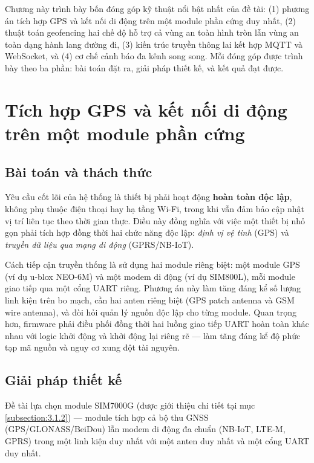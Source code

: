 \documentclass[../DoAn.tex]{subfiles}
\begin{document}
Chương này trình bày bốn đóng góp kỹ thuật nổi bật nhất của đề tài: (1) phương án tích hợp GPS và kết nối di động trên một module phần cứng duy nhất, (2) thuật toán geofencing hai chế độ hỗ trợ cả vùng an toàn hình tròn lẫn vùng an toàn dạng hành lang đường đi, (3) kiến trúc truyền thông lai kết hợp MQTT và WebSocket, và (4) cơ chế cảnh báo đa kênh song song. Mỗi đóng góp được trình bày theo ba phần: bài toán đặt ra, giải pháp thiết kế, và kết quả đạt được.

\section{Tích hợp GPS và kết nối di động trên một module phần cứng}
\label{section:5.1}

\subsection{Bài toán và thách thức}

Yêu cầu cốt lõi của hệ thống là thiết bị phải hoạt động \textbf{hoàn toàn độc lập}, không phụ thuộc điện thoại hay hạ tầng Wi-Fi, trong khi vẫn đảm bảo cập nhật vị trí liên tục theo thời gian thực. Điều này đồng nghĩa với việc một thiết bị nhỏ gọn phải tích hợp đồng thời hai chức năng độc lập: \textit{định vị vệ tinh} (GPS) và \textit{truyền dữ liệu qua mạng di động} (GPRS/NB-IoT).

Cách tiếp cận truyền thống là sử dụng hai module riêng biệt: một module GPS (ví dụ u-blox NEO-6M) và một modem di động (ví dụ SIM800L), mỗi module giao tiếp qua một cổng UART riêng. Phương án này làm tăng đáng kể số lượng linh kiện trên bo mạch, cần hai anten riêng biệt (GPS patch antenna và GSM wire antenna), và đòi hỏi quản lý nguồn độc lập cho từng module. Quan trọng hơn, firmware phải điều phối đồng thời hai luồng giao tiếp UART hoàn toàn khác nhau với logic khởi động và khởi động lại riêng rẽ — làm tăng đáng kể độ phức tạp mã nguồn và nguy cơ xung đột tài nguyên.

\subsection{Giải pháp thiết kế}

Đề tài lựa chọn module SIM7000G (được giới thiệu chi tiết tại mục \ref{subsection:3.1.2}) — module tích hợp cả bộ thu GNSS (GPS/GLONASS/BeiDou) lẫn modem di động đa chuẩn (NB-IoT, LTE-M, GPRS) trong một linh kiện duy nhất với một anten duy nhất và một cổng UART duy nhất.
\end{document}
